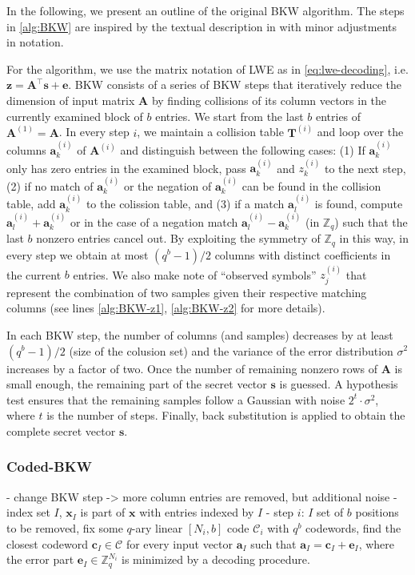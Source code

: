 {In the following, we present an outline of the original BKW algorithm. The steps in \cref{alg:BKW} are inspired by the textual description in \cite{GJS15} with minor adjustments in notation. 

For the algorithm, we use the matrix notation of LWE as in \cref{eq:lwe-decoding}, i.e. $\mathbf{z} = \mathbf{A}^\intercal \mathbf{s} + \mathbf{e}$. BKW consists of a series of BKW steps that iteratively reduce the dimension of input matrix $\mathbf{A}$ by finding collisions of its column vectors in the currently examined block of $b$ entries. We start from the last $b$ entries of $\mathbf{A}^{(1)} = \mathbf{A}$. In every step $i$, we maintain a collision table $\mathbf{T}^{(i)}$ and loop over the columns $\mathbf{a}_k^{(i)}$ of $\mathbf{A}^{(i)}$ and distinguish between the following cases: (1) If $\mathbf{a}_k^{(i)}$ only has zero entries in the examined block, pass $\mathbf{a}_k^{(i)}$ and $z_k^{(i)}$ to the next step, (2) if no match of $\mathbf{a}_k^{(i)}$ or the negation of $\mathbf{a}_k^{(i)}$ can be found in the collision table, add $\mathbf{a}_k^{(i)}$ to the colission table, and (3) if a match $\mathbf{a}_l^{(i)}$ is found, compute $\mathbf{a}_l^{(i)} + \mathbf{a}_k^{(i)}$ or in the case of a negation match $\mathbf{a}_l^{(i)} - \mathbf{a}_k^{(i)}$ (in $\mathbb{Z}_q$) such that the last $b$ nonzero entries cancel out. By exploiting the symmetry of $\mathbb{Z}_q$ in this way, in every step we obtain at most $(q^b - 1)/2$ columns with distinct coefficients in the current $b$ entries. We also make note of ``observed symbols'' $z_j^{(i)}$ that represent the combination of two samples given their respective matching columns (see lines \ref{alg:BKW-z1}, \ref{alg:BKW-z2} for more details).

In each BKW step, the number of columns (and samples) decreases by at least $(q^b - 1)/2$ (size of the colusion set) and the variance of the error distribution $\sigma^2$ increases by a factor of two. Once the number of remaining nonzero rows of $\mathbf{A}$ is small enough, the remaining part of the secret vector $\mathbf{s}$ is guessed. A hypothesis test ensures that the remaining samples follow a Gaussian with noise $2^t\cdot \sigma^2$, where $t$ is the number of steps. Finally, back substitution is applied to obtain the complete secret vector $\mathbf{s}$. %

\subsubsection*{Coded-BKW \cite{GJS15}}
- change BKW step -> more column entries are removed, but additional noise
- index set $I$, $\mathbf{x}_I$ is part of $\mathbf{x}$ with entries indexed by $I$
- step $i$: $I$ set of $b$ positions to be removed, fix some $q$-ary linear $\left[N_i, b\right]$ code $\mathcal{C}_i$ with $q^b$ codewords, find the closest codeword $\mathbf{c}_I \in \mathcal{C}$ for every input vector $\mathbf{a}_I$ such that $\mathbf{a}_I = \mathbf{c}_I + \mathbf{e}_I$, where the error part $\mathbf{e}_I \in \mathbb{Z}_q^{N_i}$ is minimized by a decoding procedure.

}
